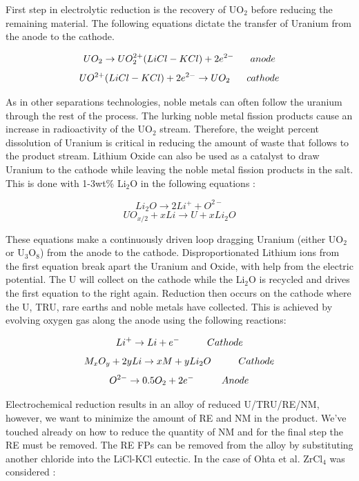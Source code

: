 First step in electrolytic reduction is the recovery of UO$_2$ before reducing the remaining material.
The following equations dictate the transfer of Uranium from the anode to the cathode.

\[ UO_2 \rightarrow UO_2^{2+}(LiCl-KCl) + 2e^{2-} \hspace{6mm} anode \]
\[ UO^{2+}(LiCl-KCl) + 2e^{2-} \rightarrow UO_2 \hspace{6mm} cathode \]

As in other separations technologies, noble metals can often follow the uranium through the rest of the process.
The lurking noble metal fission products cause an increase in radioactivity of the UO$_2$ stream. 
Therefore, the weight percent dissolution of Uranium is critical in reducing the amount of waste that follows to the product stream.
Lithium Oxide can also be used as a catalyst to draw Uranium to the cathode while leaving the noble metal fission products in the salt.
This is done with 1-3wt\% Li$_2$O in the following equations \cite{hur_electrochemical_nodate}:

\[ Li_2O \rightarrow 2Li^+ + O^{2-} \]
\[ UO_{x/2} + xLi \rightarrow U + xLi_2O \]

These equations make a continuously driven loop dragging Uranium (either UO$_2$ or U$_3$O$_8$) from the anode to the cathode. 
Disproportionated Lithium ions from the first equation break apart the Uranium and Oxide, with help from the electric potential.
The U will collect on the cathode while the Li$_2$O is recycled and drives the first equation to the right again. 
Reduction then occurs on the cathode where the U, TRU, rare earths and noble metals have collected.
This is achieved by evolving oxygen gas along the anode using the following reactions\cite{hur_electrochemical_nodate,organisation}:

\[ Li^+ \rightarrow Li + e^- \hspace{10mm} Cathode \]
\[ M_xO_y + 2yLi \rightarrow xM + yLi_2O \hspace{10mm} Cathode \]
\[ O^{2-} \rightarrow 0.5O_2 + 2e^- \hspace{10mm} Anode \]

Electrochemical reduction results in an alloy of reduced U/TRU/RE/NM, however, we want to minimize the amount of RE and NM in the product.
We've touched already on how to reduce the quantity of NM and for the final step the RE must be removed.
The RE FPs can be removed from the alloy by substituting another chloride into the LiCl-KCl eutectic.
In the case of Ohta et al. ZrCl$_4$ was considered \cite{ohta}:

